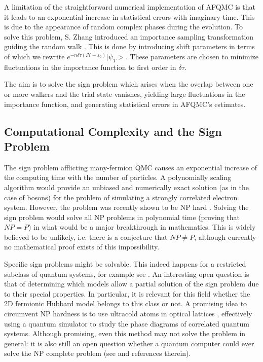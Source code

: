 A limitation of the straightforward numerical implementation of AFQMC is that it leads to an exponential increase in statistical errors with imaginary time. This is due to the appearance of random complex phases during the evolution. To solve this problem, S. Zhang introduced an importance sampling transformation guiding the random walk \cite{zphase}  . This is done by introducing shift parameters in terms of which we rewrite $e^{-n\delta \tau (\mathcal{H} - \varepsilon_0)} |\psi_T >$. These parameters are chosen to minimize fluctuations in the importance function to first order in $\delta \tau$.\par

The aim is to solve the sign problem which arises when the overlap between one or more walkers and the trial state vanishes, yielding large fluctuations in the importance function, and generating statistical errors in AFQMC's estimates.

\subsection{Computational Complexity and the Sign Problem}

The sign problem afflicting many-fermion QMC causes an exponential increase of the computing time with the number of particles. A polynomially scaling algorithm would provide an unbiased and numerically exact solution (as in the case of bosons) for the problem of simulating a strongly correlated electron system. However, the problem was recently shown to be NP hard \cite{troyer}. Solving the sign problem would solve all NP problems in polynomial time (proving that $NP = P$) in what would be a major breakthrough in mathematics. This is widely believed to be unlikely, i.e. there is a conjecture that $NP \neq P$, although currently no mathematical proof exists of this impossibility.\par

Specific sign problems might be solvable. This indeed happens for a restricted subclass of quantum systems, for example see \cite{wiese, arnow,kalos}. An interesting open question is that of determining which models allow a partial solution of the sign problem due to their special properties. In particular, it is relevant for this field whether the 2D fermionic Hubbard model belongs to this class or not. A promising idea to circumvent NP hardness is to use ultracold atoms in optical lattices \cite{optical}, effectively using a quantum simulator to study the phase diagrams of correlated quantum systems. Although promising, even this method may not solve the problem in general: it is also still an open question whether a quantum computer could ever solve the NP complete problem (see \cite{troyer} and references therein).